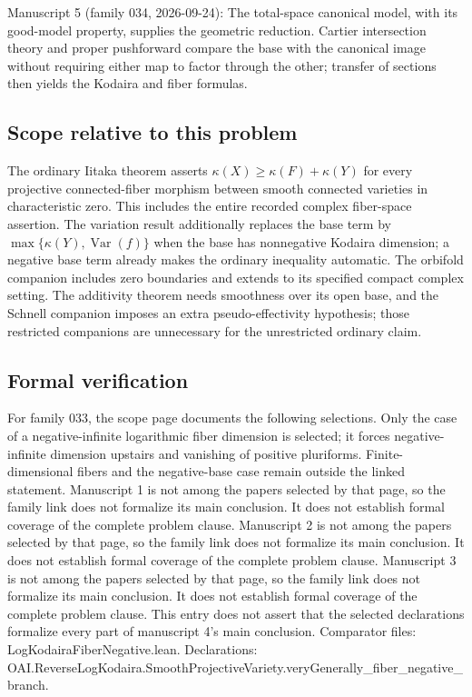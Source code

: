\documentclass[11pt]{article}
\begin{document}
Manuscript 5 (family 034, 2026-09-24): The total-space canonical model, with its good-model property, supplies the geometric reduction. Cartier intersection theory and proper pushforward compare the base with the canonical image without requiring either map to factor through the other; transfer of sections then yields the Kodaira and fiber formulas.

\subsection{Scope relative to this problem}
The ordinary Iitaka theorem asserts $\kappa(X)\ge\kappa(F)+\kappa(Y)$ for every projective connected-fiber morphism between smooth connected varieties in characteristic zero. This includes the entire recorded complex fiber-space assertion. The variation result additionally replaces the base term by $\max\{\kappa(Y),\operatorname{Var}(f)\}$ when the base has nonnegative Kodaira dimension; a negative base term already makes the ordinary inequality automatic. The orbifold companion includes zero boundaries and extends to its specified compact complex setting. The additivity theorem needs smoothness over its open base, and the Schnell companion imposes an extra pseudo-effectivity hypothesis; those restricted companions are unnecessary for the unrestricted ordinary claim.

\subsection{Formal verification}
For family 033, the scope page documents the following selections. Only the case of a negative-infinite logarithmic fiber dimension is selected; it forces negative-infinite dimension upstairs and vanishing of positive pluriforms. Finite-dimensional fibers and the negative-base case remain outside the linked statement. Manuscript 1 is not among the papers selected by that page, so the family link does not formalize its main conclusion. It does not establish formal coverage of the complete problem clause. Manuscript 2 is not among the papers selected by that page, so the family link does not formalize its main conclusion. It does not establish formal coverage of the complete problem clause. Manuscript 3 is not among the papers selected by that page, so the family link does not formalize its main conclusion. It does not establish formal coverage of the complete problem clause. This entry does not assert that the selected declarations formalize every part of manuscript 4's main conclusion. Comparator files: LogKodairaFiberNegative.lean. Declarations: OAI.ReverseLogKodaira.SmoothProjectiveVariety.veryGenerally\_fiber\_negative\_branch.
\end{document}
